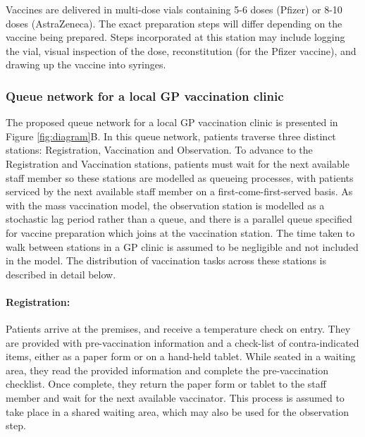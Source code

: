 \documentclass{article}
\begin{document}
Vaccines are delivered in multi-dose vials containing 5-6 doses (Pfizer)
or 8-10 doses (AstraZeneca). The exact preparation steps will differ
depending on the vaccine being prepared. Steps incorporated at this
station may include logging the vial, visual inspection of the dose,
reconstitution (for the Pfizer vaccine), and drawing up the vaccine into
syringes.

\hypertarget{queue-network-for-a-local-gp-vaccination-clinic}{%
\subsubsection{Queue network for a local GP vaccination
clinic}\label{queue-network-for-a-local-gp-vaccination-clinic}}

The proposed queue network for a local GP vaccination clinic is
presented in Figure \ref{fig:diagram}B. In this queue network, patients
traverse three distinct stations: Registration, Vaccination and
Observation. To advance to the Registration and Vaccination stations,
patients must wait for the next available staff member so these stations
are modelled as queueing processes, with patients serviced by the next
available staff member on a first-come-first-served basis. As with the
mass vaccination model, the observation station is modelled as a
stochastic lag period rather than a queue, and there is a parallel queue
specified for vaccine preparation which joins at the vaccination
station. The time taken to walk between stations in a GP clinic is
assumed to be negligible and not included in the model. The distribution
of vaccination tasks across these stations is described in detail below.

\hypertarget{registration-1}{%
\paragraph{Registration:}\label{registration-1}}

Patients arrive at the premises, and receive a temperature check on
entry. They are provided with pre-vaccination information and a
check-list of contra-indicated items, either as a paper form or on a
hand-held tablet. While seated in a waiting area, they read the provided
information and complete the pre-vaccination checklist. Once complete,
they return the paper form or tablet to the staff member and wait for
the next available vaccinator. This process is assumed to take place in
a shared waiting area, which may also be used for the observation step.
\end{document}
